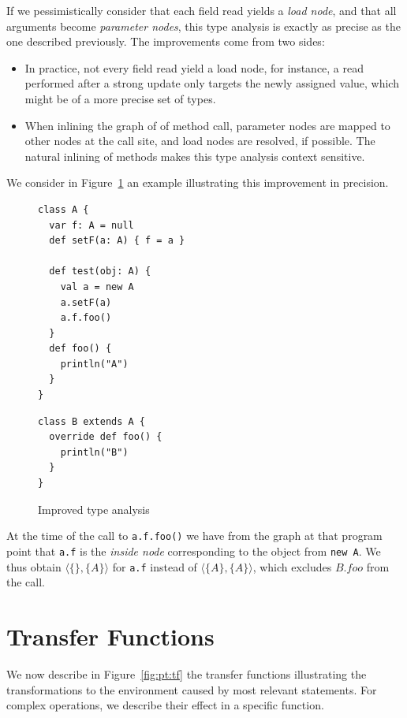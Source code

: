 If we pessimistically consider that each field read yields a \emph{load node},
and that all arguments become \emph{parameter nodes}, this type analysis is
exactly as precise as the one described previously. The improvements come
from two sides:
\begin{itemize}
    \item In practice, not every field read yield a load node, for instance, a
read performed after a strong update only targets the newly assigned value,
which might be of a more precise set of types.
    \item When inlining the graph of of method call, parameter nodes are mapped to other nodes
at the call site, and load nodes are resolved, if possible. The natural
inlining of methods makes this type analysis context sensitive. 
\end{itemize}
We consider in Figure~\ref{fig:pt:precise} an example illustrating this
improvement in precision.

\begin{figure}[h]
    \centering
\begin{minipage}[tl]{0.5\linewidth}
    \centering
\lstset{linewidth=0.8\linewidth}
\begin{lstlisting}
class A {
  var f: A = null
  def setF(a: A) { f = a }

  def test(obj: A) {
    val a = new A
    a.setF(a)
    a.f.foo()
  }
  def foo() {
    println("A")
  }
}
\end{lstlisting}
\end{minipage}
\begin{minipage}[tl]{0.5\linewidth}
    \centering
\lstset{linewidth=0.8\linewidth}
\begin{lstlisting}
class B extends A {
  override def foo() {
    println("B")
  }
}
\end{lstlisting}
\end{minipage}
    \caption{Improved type analysis}
    \label{fig:pt:precise}
\end{figure}

At the time of the call to \verb/a.f.foo()/ we have from the graph at that
program point that \verb/a.f/ is the \emph{inside node} corresponding to the
object from \verb/new A/. We thus obtain $\langle \{\}, \{A\} \rangle$ for \verb/a.f/ instead of
$\langle \{A\}, \{A\} \rangle$, which excludes $B.foo$ from the call.
\section{Transfer Functions}
We now describe  in Figure~\ref{fig:pt:tf} the transfer functions illustrating
the transformations to the environment caused by most relevant statements. For
complex operations, we describe their effect in a specific function.

